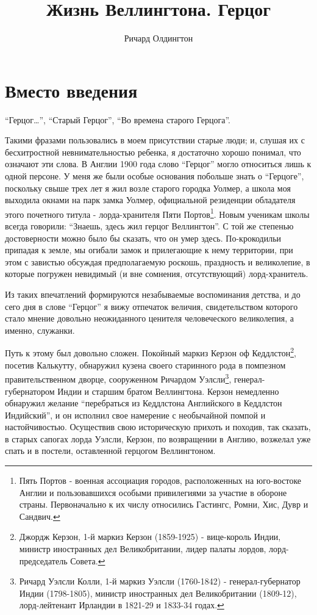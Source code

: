 \documentclass[
  oneside,
  12pt,
  titlepage]{book}
\title{Жизнь Веллингтона. Герцог}
\author{Ричард Олдингтон}
\date{}
\begin{document}
\maketitle

{
\setcounter{tocdepth}{1}
\tableofcontents
}
\hypertarget{ux432ux43cux435ux441ux442ux43e-ux432ux432ux435ux434ux435ux43dux438ux44f}{%
\chapter{Вместо введения}\label{ux432ux43cux435ux441ux442ux43e-ux432ux432ux435ux434ux435ux43dux438ux44f}}

``Герцог\ldots{}'', ``Старый Герцог'', ``Во времена старого Герцога''.

Такими фразами пользовались в моем присутствии старые люди; и, слушая их с бесхитростной невнимательностью ребенка, я достаточно хорошо понимал, что означают эти слова. В Англии 1900 года слово ``Герцог'' могло относиться лишь к одной персоне. У меня же были особые основания побольше знать о ``Герцоге'', поскольку свыше трех лет я жил возле старого городка Уолмер, а школа моя выходила окнами на парк замка Уолмер, официальной резиденции обладателя этого почетного титула - лорда-хранителя Пяти Портов\footnote{Пять Портов - военная ассоциация городов, расположенных на юго-востоке Англии и пользовавшихся особыми привилегиями за участие в обороне страны. Первоначально к их числу относились Гастингс, Ромни, Хис, Дувр и Сандвич.}. Новым ученикам школы всегда говорили: ``Знаешь, здесь жил герцог Веллингтон''. С той же степенью достоверности можно было бы сказать, что он умер здесь. По-крокодильи припадая к земле, мы огибали замок и прилегающие к нему территории, при этом с завистью обсуждая предполагаемую роскошь, праздность и великолепие, в которые погружен невидимый (и вне сомнения, отсутствующий) лорд-хранитель.

Из таких впечатлений формируются незабываемые воспоминания детства, и до сего дня в слове ``Герцог'' я вижу отпечаток величия, свидетельством которого стало мнение довольно неожиданного ценителя человеческого великолепия, а именно, служанки.

Путь к этому был довольно сложен. Покойный маркиз Керзон оф Кеддлстон\footnote{Джордж Керзон, 1-й маркиз Керзон (1859-1925) - вице-король Индии, министр иностранных дел Великобритании, лидер палаты лордов, лорд-председатель Совета.}, посетив Калькутту, обнаружил кузена своего старинного рода в помпезном правительственном дворце, сооруженном Ричардом Уэлсли\footnote{Ричард Уэлсли Колли, 1-й маркиз Уэлсли (1760-1842) - генерал-губернатор Индии (1798-1805), министр иностранных дел Великобритании (1809-12), лорд-лейтенант Ирландии в 1821-29 и 1833-34 годах.}, генерал-губернатором Индии и старшим братом Веллингтона. Керзон немедленно обнаружил желание ``перебраться из Кеддлстона Английского в Кеддлстон Индийский'', и он исполнил свое намерение с необычайной помпой и настойчивостью. Осуществив свою историческую прихоть и походив, так сказать, в старых сапогах лорда Уэлсли, Керзон, по возвращении в Англию, возжелал уже спать и в постели, оставленной герцогом Веллингтоном.
\end{document}
